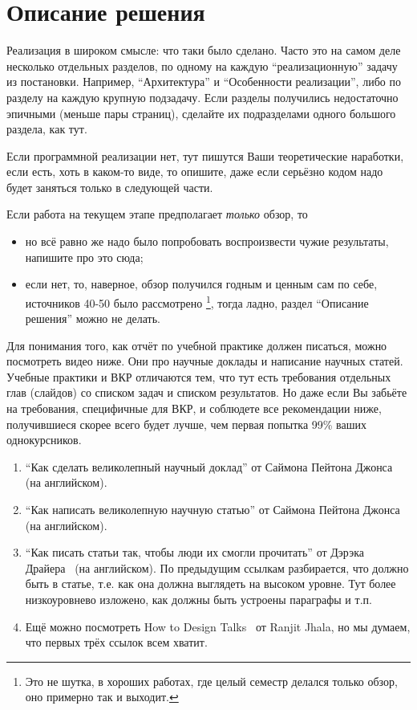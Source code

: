 
\section{Описание решения}
Реализация в широком смысле: что таки было сделано.
Часто это на самом деле несколько отдельных разделов, по одному на каждую \enquote{реализационную} задачу из постановки.
Например, \enquote{Архитектура} и \enquote{Особенности реализации}, либо по разделу на каждую крупную подзадачу.
Если разделы получились недостаточно эпичными (меньше пары страниц), сделайте их подразделами одного большого раздела, как тут.

Если программной реализации нет, тут пишутся Ваши теоретические наработки, если есть, хоть в каком-то виде, то опишите, даже если серьёзно кодом надо будет заняться только в следующей части.

Если работа на текущем этапе предполагает \emph{только} обзор, то
\begin{itemize}
    \item но всё равно же надо было попробовать воспроизвести чужие результаты, напишите про это сюда;
    \item если нет, то, наверное, обзор получился годным и ценным сам по себе, источников 40-50 было рассмотрено%
          \footnote{Это не шутка, в хороших работах, где целый семестр делался только обзор, оно примерно так и выходит.},
          тогда ладно, раздел \enquote{Описание решения} можно не делать.
\end{itemize}

Для понимания того, как отчёт по учебной практике должен писаться, можно посмотреть видео ниже.
Они про научные доклады и написание научных статей.
Учебные практики и ВКР отличаются тем, что тут есть требования отдельных глав (слайдов) со списком задач и списком результатов.
Но даже если Вы забьёте на требования, специфичные для ВКР, и соблюдете все рекомендации ниже, получившиеся скорее всего будет лучше, чем первая попытка 99\% ваших однокурсников.

\begin{enumerate}
    \item \enquote{Как сделать великолепный научный доклад} от Саймона Пейтона Джонса~\cite{SPJGreatTalk} (на английском).
    \item \enquote{Как написать великолепную научную статью} от Саймона Пейтона Джонса~\cite{SPJGreatPaper} (на английском).
    \item \enquote{Как писать статьи так, чтобы люди их смогли прочитать} от Дэрэка Драйера~\cite{DreyerYoutube2020} (на английском).
          По предыдущим ссылкам разбирается, что должно быть в статье, т.е. как она должна выгля\-деть на высоком уровне.
          Тут более низкоуровнево изложено, как должны быть устроены параграфы и т.п.
    \item Ещё можно посмотреть How to Design Talks~\cite{JhalaYoutube2020} от Ranjit Jhala, но мы думаем, что первых трёх ссылок всем хватит.
\end{enumerate}

